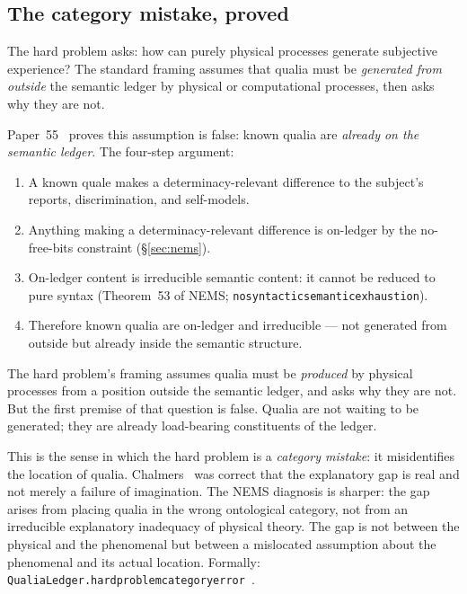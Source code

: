\documentclass[11pt]{article}
\theoremstyle{remark}
\newcommand{\lean}[1]{%
  \penalty-100
  \begingroup\def\_{\textunderscore\allowbreak}\texttt{#1}\endgroup}
\begin{document}
\subsection{The category mistake, proved}\label{sec:hard-proof}

The hard problem asks: how can purely physical processes generate subjective experience?
The standard framing assumes that qualia must be \emph{generated from outside} the
semantic ledger by physical or computational processes, then asks why they are not.

Paper~55~\cite{SpivackNEMS55} proves this assumption is false: known qualia are
\emph{already on the semantic ledger}. The four-step argument:

\begin{enumerate}
  \item A known quale makes a determinacy-relevant difference to the subject's
    reports, discrimination, and self-models.
  \item Anything making a determinacy-relevant difference is on-ledger by the
    no-free-bits constraint (\S\ref{sec:nems}).
  \item On-ledger content is irreducible semantic content: it cannot be reduced to
    pure syntax (Theorem~53 of NEMS; \lean{no\_syntactic\allowbreak\_semantic\_exhaustion}).
  \item Therefore known qualia are on-ledger and irreducible --- not generated
    from outside but already inside the semantic structure.
\end{enumerate}

The hard problem's framing assumes qualia must be \emph{produced} by physical
processes from a position outside the semantic ledger, and asks why they are not.
But the first premise of that question is false. Qualia are not waiting to be generated;
they are already load-bearing constituents of the ledger.

This is the sense in which the hard problem is a \emph{category mistake}: it
misidentifies the location of qualia. Chalmers~\cite{Chalmers1995,chalmers1996} was
correct that the explanatory gap is real and not merely a failure of imagination. The
NEMS diagnosis is sharper: the gap arises from placing qualia in the wrong ontological
category, not from an irreducible explanatory inadequacy of physical theory. The gap
is not between the physical and the phenomenal but between a
mislocated assumption about the phenomenal and its actual location.
Formally: \lean{QualiaLedger.hard\_problem\_category\_error}~\cite{SpivackNEMS55}.
\end{document}
